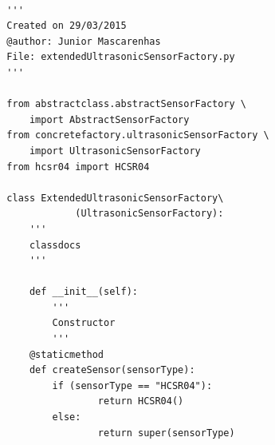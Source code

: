 \documentclass{acm_proc_article-sp}
\begin{document}
\begin{verbatim}

  '''
  Created on 29/03/2015
  @author: Junior Mascarenhas
  File: extendedUltrasonicSensorFactory.py
  '''

  from abstractclass.abstractSensorFactory \
      import AbstractSensorFactory
  from concretefactory.ultrasonicSensorFactory \
      import UltrasonicSensorFactory
  from hcsr04 import HCSR04

  class ExtendedUltrasonicSensorFactory\
              (UltrasonicSensorFactory):
      '''
      classdocs
      '''

      def __init__(self):
          '''
          Constructor
          '''
      @staticmethod
      def createSensor(sensorType):
          if (sensorType == "HCSR04"):
                  return HCSR04()
          else:
                  return super(sensorType)
\end{verbatim}


\end{document}
